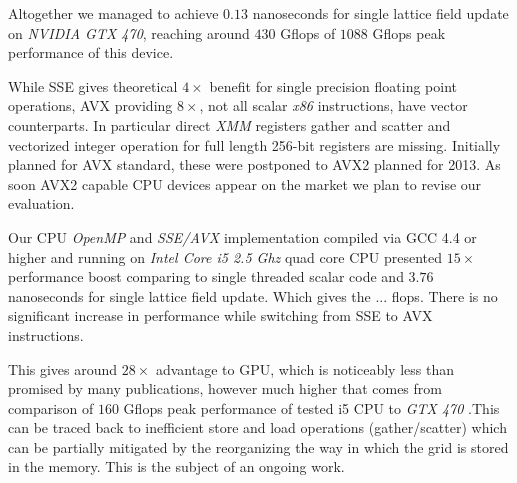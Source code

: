 \documentclass[11pt,a4paper]{article}
\begin{document}
Altogether we managed to achieve $0.13$ nanoseconds for single lattice
field update on \emph{NVIDIA GTX 470}, reaching around $430$ Gflops of
$1088$ Gflops peak performance of this device. 


While SSE gives theoretical $4\times$ benefit for single precision
floating point operations, AVX providing $8\times$, not all scalar
\emph{x86} instructions, have vector counterparts.  In particular
direct \emph{XMM} registers gather and scatter and vectorized integer
operation for full length 256-bit registers are missing. Initially
planned for AVX standard, these were postponed to AVX2 planned for
2013. As soon AVX2 capable CPU devices appear on the
market we plan to revise our evaluation.


Our CPU \emph{OpenMP} and \emph{SSE/AVX} implementation compiled via
GCC 4.4 or higher and running on \emph{Intel Core i5 2.5 Ghz} quad
core CPU presented $15\times$ performance boost comparing to single
threaded scalar code and $3.76$ nanoseconds for single lattice field
update.  Which gives the ... flops. There is no significant increase
in performance while switching from SSE to AVX instructions.

This gives around $28\times$ advantage to GPU, which is noticeably
less than promised by many publications, however much higher that
comes from comparison of $160$ Gflops peak performance of tested i5
CPU to \emph{GTX 470} \cite{Lee:2010:DGV:1816038.1816021}.This can be
traced back to inefficient store and load operations (gather/scatter)
which can be partially mitigated by the reorganizing the way in which
the grid is stored in the memory. This is the subject of an ongoing
work.

{}

\end{document}

